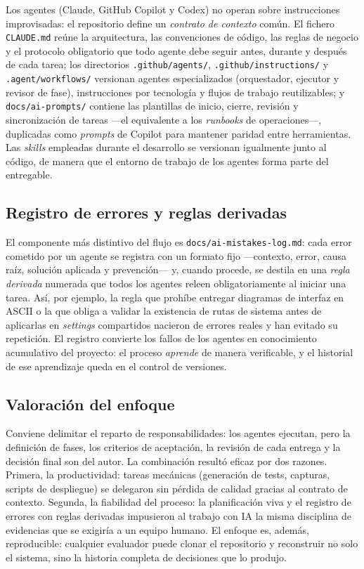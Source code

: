 Los agentes (Claude, GitHub Copilot y Codex) no operan sobre instrucciones improvisadas: el
repositorio define un \emph{contrato de contexto} com\'un. El fichero \texttt{CLAUDE.md}
re\'une la arquitectura, las convenciones de c\'odigo, las reglas de negocio y el protocolo
obligatorio que todo agente debe seguir antes, durante y despu\'es de cada tarea; los
directorios \texttt{.github/agents/}, \texttt{.github/instructions/} y
\texttt{.agent/workflows/} versionan agentes especializados (orquestador, ejecutor y revisor de
fase), instrucciones por tecnolog\'ia y flujos de trabajo reutilizables; y
\texttt{docs/ai-prompts/} contiene las plantillas de inicio, cierre, revisi\'on y
sincronizaci\'on de tareas ---el equivalente a los \emph{runbooks} de operaciones---,
duplicadas como \emph{prompts} de Copilot para mantener paridad entre herramientas. Las
\emph{skills} empleadas durante el desarrollo se versionan igualmente junto al c\'odigo, de
manera que el entorno de trabajo de los agentes forma parte del entregable.

\subsection{Registro de errores y reglas derivadas}

El componente m\'as distintivo del flujo es \texttt{docs/ai-mistakes-log.md}: cada error
cometido por un agente se registra con un formato fijo ---contexto, error, causa ra\'iz,
soluci\'on aplicada y prevenci\'on--- y, cuando procede, se destila en una \emph{regla
derivada} numerada que todos los agentes releen obligatoriamente al iniciar una tarea. As\'i,
por ejemplo, la regla que proh\'ibe entregar diagramas de interfaz en ASCII o la que obliga a
validar la existencia de rutas de sistema antes de aplicarlas en \emph{settings} compartidos
nacieron de errores reales y han evitado su repetici\'on. El registro convierte los fallos de
los agentes en conocimiento acumulativo del proyecto: el proceso \emph{aprende} de manera
verificable, y el historial de ese aprendizaje queda en el control de versiones.

\subsection{Valoraci\'on del enfoque}

Conviene delimitar el reparto de responsabilidades: los agentes ejecutan, pero la definici\'on
de fases, los criterios de aceptaci\'on, la revisi\'on de cada entrega y la decisi\'on final
son del autor. La combinaci\'on result\'o eficaz por dos razones. Primera, la productividad:
tareas mec\'anicas (generaci\'on de tests, capturas, scripts de despliegue) se delegaron sin
p\'erdida de calidad gracias al contrato de contexto. Segunda, la fiabilidad del proceso: la
planificaci\'on viva y el registro de errores con reglas derivadas impusieron al trabajo con IA
la misma disciplina de evidencias que se exigir\'ia a un equipo humano. El enfoque es, adem\'as,
reproducible: cualquier evaluador puede clonar el repositorio y reconstruir no solo el sistema,
sino la historia completa de decisiones que lo produjo.


